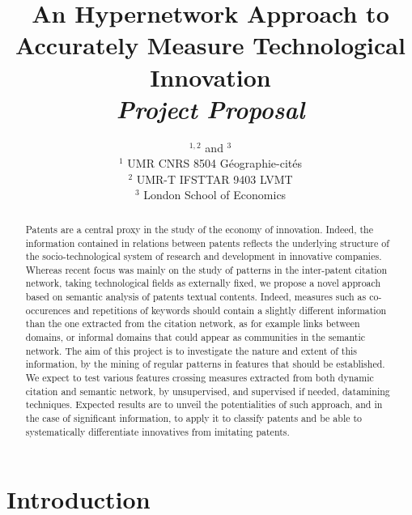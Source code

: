


\title{
An Hypernetwork Approach to Accurately Measure Technological Innovation
\bigskip\\
\textit{Project Proposal}
}
\author{$^{1,2}$ and $^{3}$\medskip\\
$^{1}$ UMR CNRS 8504 G{\'e}ographie-cit{\'e}s\\
$^{2}$ UMR-T IFSTTAR 9403 LVMT\\
$^{3}$ London School of Economics
}
\date{}


\maketitle

\justify


\begin{abstract}
Patents are a central proxy in the study of the economy of innovation. Indeed, the information contained in relations between patents reflects the underlying structure of the socio-technological system of research and development in innovative companies. Whereas recent focus was mainly on the study of patterns in the inter-patent citation network, taking technological fields as externally fixed, we propose a novel approach based on semantic analysis of patents textual contents. Indeed, measures such as co-occurences and repetitions of keywords should contain a slightly different information than the one extracted from the citation network, as for example links between domains, or informal domains that could appear as communities in the semantic network. The aim of this project is to investigate the nature and extent of this information, by the mining of regular patterns in features that should be established. We expect to test various features crossing measures extracted from both dynamic citation and semantic network, by unsupervised, and supervised if needed, datamining techniques. Expected results are to unveil the potentialities of such approach, and in the case of significant information, to apply it to classify patents and be able to systematically differentiate innovatives from imitating patents.
\end{abstract}


\section{Introduction}

